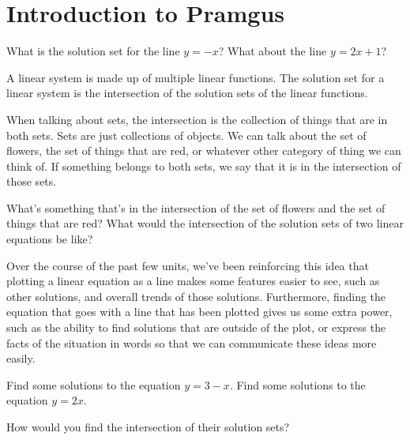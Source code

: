 \chapter{Introduction to Pramgus}

\begin{recall}
What is the solution set for the line $y=-x$? What about the line $y=2x+1$?
\end{recall}


\begin{defn}
	A linear system is made up of multiple linear functions. The solution set for a linear system is the intersection of the solution sets of the linear functions. 
\end{defn}

When talking about sets, the intersection is the collection of things that are in both sets.  Sets are just collections of objects.  We can talk about the set of flowers, the set of things that are red, or whatever other category of thing we can think of.  If something belongs to both sets, we say that it is in the intersection of those sets.  

\begin{prblm}
What's something that's in the intersection of the set of flowers and the set of things that are red?
What would the intersection of the solution sets of two linear equations be like?
\end{prblm}

Over the course of the past few units, we've been reinforcing this idea that plotting a linear equation as a line makes some features easier to see, such as other solutions, and overall trends of those solutions.  Furthermore, finding the equation that goes with a line that has been plotted gives us some extra power, such as the ability to find solutions that are outside of the plot, or express the facts of the situation in words so that we can communicate these ideas more easily.

\begin{problem}
Find some solutions to the equation $y = 3 - x$.
Find some solutions to the equation $y = 2x$.

How would you find the intersection of their solution sets?
\end{problem}